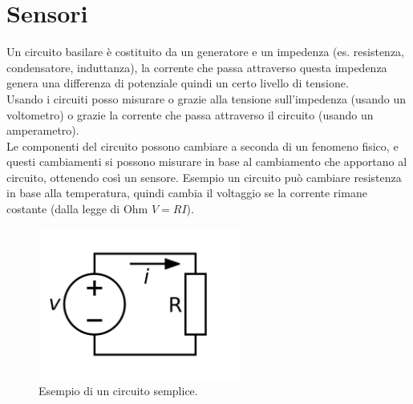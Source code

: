 \documentclass[11pt, twocolumn]{article}
\begin{document}
\section{Sensori}
Un circuito basilare è costituito da un generatore e un impedenza (es. resistenza, condensatore, induttanza), la corrente che passa attraverso questa impedenza genera una differenza di potenziale quindi un certo livello di tensione.\\
Usando i circuiti posso misurare o grazie alla tensione sull'impedenza (usando un voltometro) o grazie la corrente che passa attraverso il circuito (usando un amperametro).\\
Le componenti del circuito possono cambiare a seconda di un fenomeno fisico, e questi cambiamenti si possono misurare in base al cambiamento che apportano al circuito, ottenendo così un sensore. Esempio un circuito può cambiare resistenza in base alla temperatura, quindi cambia il voltaggio se la corrente rimane costante (dalla legge di Ohm $V=RI$).\\ 
\begin{figure}[!h]
  \centering
  \includegraphics[width=\linewidth,height=5cm]{imgs/curcuit.png}
  \caption{Esempio di un circuito semplice.}
  \label{fig:circuit}
\end{figure}
      
\end{document}
